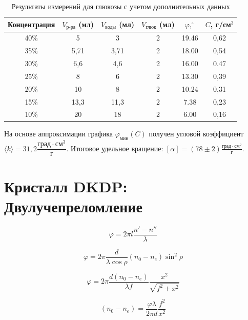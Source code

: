 \documentclass[a4paper,12pt]{article}
\begin{document}
\begin{table}[h]
\centering
\begin{tabular}{cccccc}
\toprule
Концентрация & $V_{\text{р-ра}}$ (мл) & $V_{\text{воды}}$ (мл) & $V_{\text{глюк}}$ (мл) & $\varphi, ^\circ$ & $C$, г/см$^3$ \\
\midrule
40\% & 5 & 3 & 2 & 19.46 & 0,62 \\
35\% & 5,71 & 3,71 & 2 & 18.00 & 0,54 \\
30\% & 6,6 & 4,6 & 2 & 16.00 & 0.47 \\
25\% & 8 & 6 & 2 & 13.30 & 0,39 \\
20\% & 10 & 8  & 2 & 10.24 & 0,31 \\
15\% & 13,3 & 11,3 & 2 & 7.38  & 0,23 \\
10\% & 20 & 18 & 2 & 6.00 & 0,16 \\
\bottomrule
\end{tabular}
\caption{Результаты измерений для глюкозы с учетом дополнительных данных}
\end{table}

На основе аппроксимации графика $\varphi_{мин}(C)$ получен угловой коэффициент $\langle k \rangle = 31,2 \dfrac{\text{град} \cdot \text{см}^3}{\text{г}}$. 
Итоговое удельное вращение: $[\alpha] = (78 \pm 2) \frac{\text{град} \cdot \text{см}^2}{\text{г}}$.

\section{Кристалл DKDP: Двулучепреломление}

\begin{equation}
\varphi = 2\pi l \frac{n' - n''}{\lambda}
\end{equation}

\begin{equation}
\varphi = 2\pi \frac{d}{\lambda \cos \rho} (n_0 - n_e) \sin^2 \rho
\end{equation}

\begin{equation}
\varphi = 2\pi \frac{d(n_0 - n_e)}{\lambda f} \frac{x^2}{\sqrt{f^2 + x^2}}
\end{equation}

\begin{equation}
(n_0 - n_e) = \frac{\varphi \lambda}{2\pi d} \frac{f^2}{x^2}
\end{equation}
\end{document}
